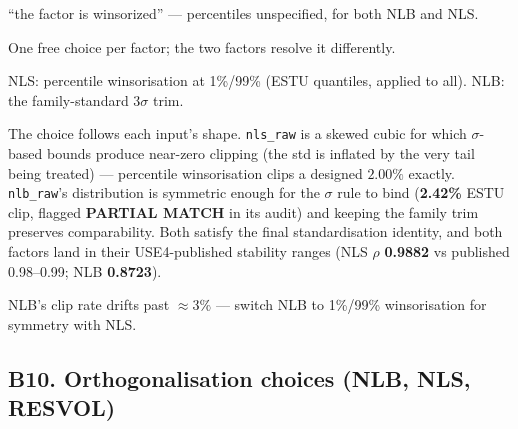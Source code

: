\documentclass[11pt,a4paper]{article}
\newcommand{\WARN}[1]{\textcolor{warn}{\textbf{#1}}}
\begin{document}
\begin{description}[style=nextline]
  \item[USE4] ``the factor is winsorized'' --- percentiles unspecified, for
    both NLB and NLS.
  \item[Deviation] One free choice per factor; the two factors resolve it
    differently.
  \item[Solution] NLS: percentile winsorisation at 1\%/99\% (ESTU quantiles,
    applied to all). NLB: the family-standard $3\sigma$ trim.
  \item[Validity] The choice follows each input's shape. \texttt{nls\_raw} is a
    skewed cubic for which $\sigma$-based bounds produce near-zero clipping
    (the std is inflated by the very tail being treated) --- percentile
    winsorisation clips a designed $2.00\%$ exactly. \texttt{nlb\_raw}'s
    distribution is symmetric enough for the $\sigma$ rule to bind
    (\textbf{2.42\%} ESTU clip, flagged \WARN{PARTIAL MATCH} in its audit) and
    keeping the family trim preserves comparability. Both satisfy the final
    standardisation identity, and both factors land in their USE4-published
    stability ranges (NLS $\rho$ \textbf{0.9882} vs published 0.98--0.99; NLB
    \textbf{0.8723}).
  \item[Revisit when] NLB's clip rate drifts past $\approx 3\%$ --- switch NLB
    to 1\%/99\% winsorisation for symmetry with NLS.
\end{description}

\subsection{B10. Orthogonalisation choices (NLB, NLS, RESVOL)}
\end{document}
